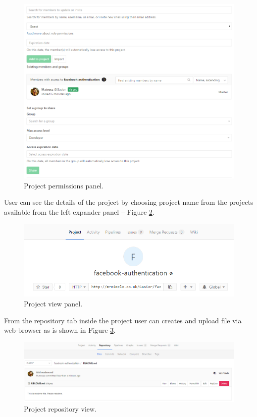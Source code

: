 	\begin{figure}[!htbp]
		\centering
		\includegraphics[width=1\textwidth]{img/ug-project/project-members-permissions}
		\caption{Project permissions panel.}
		\label{fig:project-members-permissions}
	\end{figure}
	User can see the details of the project by choosing project name from the projects available from the left expander panel -- Figure \ref{fig:project-view-panel}.
	\begin{figure}[!htbp]
		\centering
		\includegraphics[width=1\textwidth]{img/ug-project/project-view}
		\caption{Project view panel.}
		\label{fig:project-view-panel}
	\end{figure}
	From the repository tab inside the project user can creates and upload file via web-browser as is shown in Figure \ref{fig:project-repository}.
	\begin{figure}[!htbp]
		\centering
		\includegraphics[width=1\textwidth]{img/ug-project/project-view2}
		\caption{Project repository view.}
		\label{fig:project-repository}
	\end{figure}
